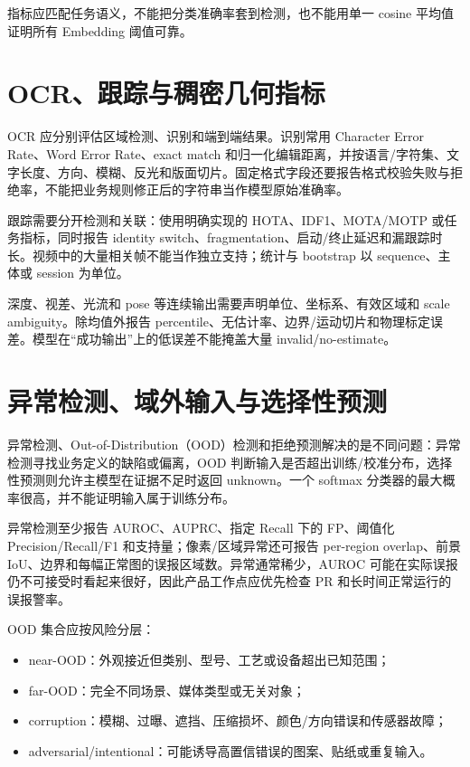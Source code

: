 指标应匹配任务语义，不能把分类准确率套到检测，也不能用单一 cosine 平均值证明所有 Embedding 阈值可靠。

\section{OCR、跟踪与稠密几何指标}

OCR 应分别评估区域检测、识别和端到端结果。识别常用 Character Error Rate、Word Error Rate、exact match 和归一化编辑距离，并按语言/字符集、文字长度、方向、模糊、反光和版面切片。固定格式字段还要报告格式校验失败与拒绝率，不能把业务规则修正后的字符串当作模型原始准确率。

跟踪需要分开检测和关联：使用明确实现的 HOTA、IDF1、MOTA/MOTP 或任务指标，同时报告 identity switch、fragmentation、启动/终止延迟和漏跟踪时长。视频中的大量相关帧不能当作独立支持；统计与 bootstrap 以 sequence、主体或 session 为单位。

深度、视差、光流和 pose 等连续输出需要声明单位、坐标系、有效区域和 scale ambiguity。除均值外报告 percentile、无估计率、边界/运动切片和物理标定误差。模型在“成功输出”上的低误差不能掩盖大量 invalid/no-estimate。

\section{异常检测、域外输入与选择性预测}

异常检测、Out-of-Distribution（OOD）检测和拒绝预测解决的是不同问题：异常检测寻找业务定义的缺陷或偏离，OOD 判断输入是否超出训练/校准分布，选择性预测则允许主模型在证据不足时返回 unknown。一个 softmax 分类器的最大概率很高，并不能证明输入属于训练分布\cite{hendrycks-ood}。

异常检测至少报告 AUROC、AUPRC、指定 Recall 下的 FP、阈值化 Precision/Recall/F1 和支持量；像素/区域异常还可报告 per-region overlap、前景 IoU、边界和每幅正常图的误报区域数。异常通常稀少，AUROC 可能在实际误报仍不可接受时看起来很好，因此产品工作点应优先检查 PR 和长时间正常运行的误报警率。

OOD 集合应按风险分层：

\begin{itemize}
  \item near-OOD：外观接近但类别、型号、工艺或设备超出已知范围；
  \item far-OOD：完全不同场景、媒体类型或无关对象；
  \item corruption：模糊、过曝、遮挡、压缩损坏、颜色/方向错误和传感器故障；
  \item adversarial/intentional：可能诱导高置信错误的图案、贴纸或重复输入。
\end{itemize}

